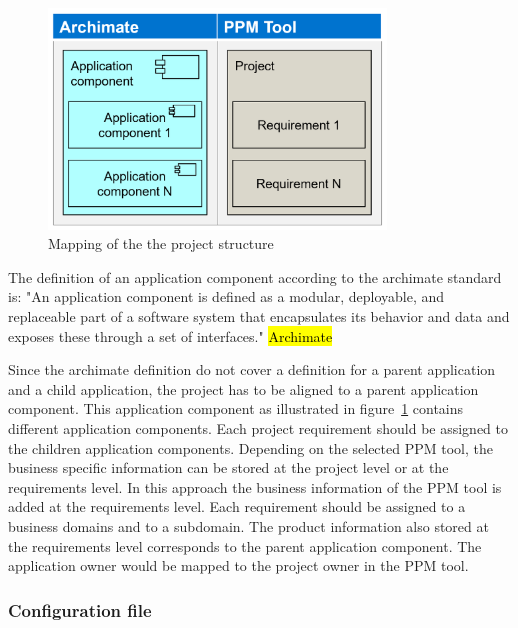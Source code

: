 \begin{figure}[htpb]
  \centering
  \includegraphics[width=0.8\textwidth]{figures/project-structure-mapping.PNG}
  \caption{Mapping of the the project structure}
  \label{fig:project-structure-mapping}
\end{figure}

The definition of an application component according to the archimate standard is: "An application component is defined as a modular, deployable, and replaceable part of a software system that encapsulates its behavior and data and exposes these through a set of interfaces." \hl{Archimate}

Since the archimate definition do not cover a definition for a parent application and a child application, the project has to be aligned to a parent application component. This application component as illustrated in figure~\ref{fig:project-structure-mapping} contains different application components. Each project requirement should be assigned to the children application components. Depending on the selected PPM tool, the business specific information can be stored at the project level or at the requirements level. In this approach the business information of the PPM tool is added at the requirements level. Each requirement should be assigned to a business domains and to a subdomain. The product information also stored at the requirements level corresponds to the parent application component. 
The application owner would be mapped to the project owner in the PPM tool.

\subsubsection{Configuration file}

